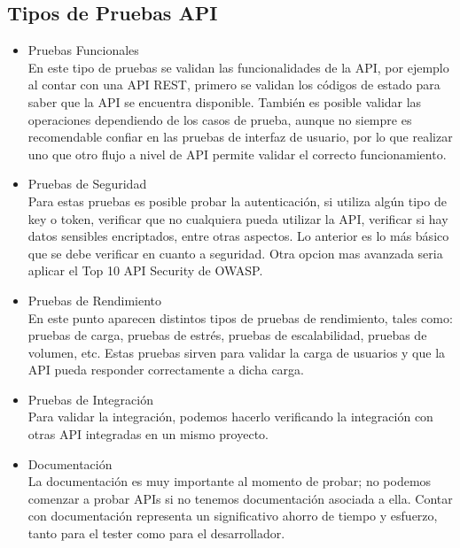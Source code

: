 \documentclass[twoside,twocolumn]{article}
\begin{document}
\subsection{Tipos de Pruebas API}
\begin{itemize}
\item Pruebas Funcionales\\
En este tipo de pruebas se validan las funcionalidades de la API, por ejemplo al contar con una API REST, primero se validan los códigos de estado para saber que la API se encuentra disponible. También es posible validar las operaciones dependiendo de los casos de prueba, aunque no siempre es recomendable confiar en las pruebas de interfaz de usuario, por lo que realizar uno que otro flujo a nivel de API permite validar el correcto funcionamiento.

\item Pruebas de Seguridad\\
Para estas pruebas es posible probar la autenticación, si utiliza algún tipo de key o token, verificar que no cualquiera pueda utilizar la API, verificar si hay datos sensibles encriptados, entre otras aspectos. Lo anterior es lo más básico que se debe verificar en cuanto a seguridad. Otra opcion mas avanzada seria aplicar el Top 10 API Security de OWASP. 

\item Pruebas de Rendimiento\\
En este punto aparecen distintos tipos de pruebas de rendimiento, tales como: pruebas de carga, pruebas de estrés, pruebas de escalabilidad, pruebas de volumen, etc. Estas pruebas sirven para validar la carga de usuarios y que la API pueda responder correctamente a dicha carga.

\item Pruebas de Integración\\
Para validar la integración, podemos hacerlo verificando la integración con otras API integradas en un mismo proyecto.

\item Documentación\\
La documentación es muy importante al momento de probar; no podemos comenzar a probar APIs si no tenemos documentación asociada a ella. Contar con documentación representa un significativo ahorro de tiempo y esfuerzo, tanto para el tester como para el desarrollador.
\end{itemize}
\end{document}
